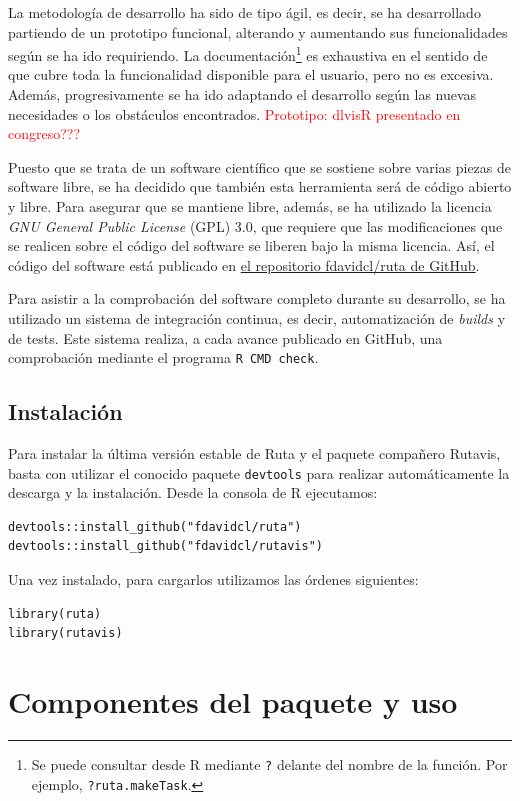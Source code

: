 La metodología de desarrollo ha sido de tipo ágil, es decir, se ha desarrollado partiendo de un prototipo funcional, alterando y aumentando sus funcionalidades según se ha ido requiriendo. La documentación\footnote{Se puede consultar desde R mediante \texttt{?} delante del nombre de la función. Por ejemplo, \texttt{?ruta.makeTask}.} es exhaustiva en el sentido de que cubre toda la funcionalidad disponible para el usuario, pero no es excesiva. Además, progresivamente se ha ido adaptando el desarrollo según las nuevas necesidades o los obstáculos encontrados. \textcolor{red}{Prototipo: dlvisR presentado en congreso???}


Puesto que se trata de un software científico que se sostiene sobre varias piezas de software libre, se ha decidido que también esta herramienta será de código abierto y libre. Para asegurar que se mantiene libre, además, se ha utilizado la licencia \textit{GNU General Public License} (GPL) 3.0, que requiere que las modificaciones que se realicen sobre el código del software se liberen bajo la misma licencia. Así, el código del software está publicado en \href{https://github.com/fdavidcl/ruta/}{el repositorio fdavidcl/ruta de GitHub}.

Para asistir a la comprobación del software completo durante su desarrollo, se ha utilizado un sistema de integración continua, es decir, automatización de \textit{builds} y de tests. Este sistema realiza, a cada avance publicado en GitHub, una comprobación mediante el programa \texttt{R CMD check}.

\subsection{Instalación}

Para instalar la última versión estable de Ruta y el paquete compañero Rutavis, basta con utilizar el conocido paquete \texttt{devtools} para realizar automáticamente la descarga y la instalación. Desde la consola de R ejecutamos:
\begin{lstlisting}[numbers=none]
devtools::install_github("fdavidcl/ruta")
devtools::install_github("fdavidcl/rutavis")
\end{lstlisting}

Una vez instalado, para cargarlos utilizamos las órdenes siguientes:
\begin{lstlisting}[numbers=none]
library(ruta)
library(rutavis)
\end{lstlisting}


\section{Componentes del paquete y uso}\label{componentes-del-paquete}

